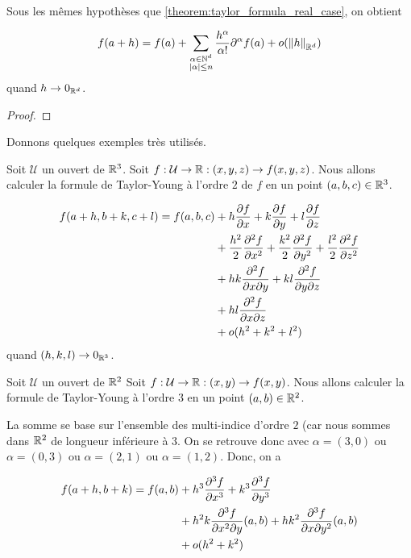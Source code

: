 \begin{theorem} 
	\label{theorem:taylor_young_formula_real_case}
	Sous les mêmes hypothèses que \ref{theorem:taylor_formula_real_case}, on
	obtient

	\begin{equation*}
		f(a + h) = f(a) + \sum_{\substack{\alpha \in \mathbb{N}^{d} \\
		|\alpha| \leq n}} \frac{h^{\alpha}}{\alpha!}
		\partial^{\alpha}f(a) + o(\norm{h}_{\mathbb{R}^{d}})
	\end{equation*}
	quand $h \rightarrow 0_{\mathbb{R}^{d}}$.
\end{theorem}

\ifdefined\outputproof
\begin{proof}

\end{proof}
\fi

Donnons quelques exemples très utilisés.

\begin{exemple}
	Soit $\mathcal{U}$ un ouvert de $\mathbb{R}^{3}$.
	Soit $f : \mathcal{U} \rightarrow \mathbb{R} : (x, y, z) \rightarrow f(x, y,
	z)$.
	Nous allons calculer la formule de Taylor-Young à l'ordre $2$ de $f$ en un
	point $(a, b, c) \in \mathbb{R}^{3}$.

	\begin{align*}
		f(a + h, b + k, c + l) = f(a, b, c)
		& + h \pdv{f}{x} (a, b, c) + k \pdv{f}{y} (a, b, c) + l \pdv{f}{z} (a, b,
		c) \\
		& + \frac{h^{2}}{2} \pdv[2]{f}{x} (a, b, c) + \frac{k^{2}}{2}
		\pdv[2]{f}{y} (a, b, c) + \frac{l^{2}}{2} \pdv[2]{f}{z} (a, b, c) \\
		& + hk \pdv{f}{x}{y} (a, b, c)
		+ kl \pdv{f}{y}{z} (a, b, c) \\
		& + hl \pdv{f}{x}{z} (a, b, c) \\
		& + o(h^{2} + k^{2} + l^{2})
	\end{align*}
	quand $(h, k, l) \rightarrow 0_{\mathbb{R}^{3}}$.
\end{exemple}

\begin{exemple}
	Soit $\mathcal{U}$ un ouvert de $\mathbb{R}^{2}$
	Soit $f : \mathcal{U} \rightarrow \mathbb{R} : (x, y) \rightarrow f(x, y)$.
	Nous allons calculer la formule de Taylor-Young à l'ordre $3$ en un point
	$(a, b) \in \mathbb{R}^{2}$.

	La somme se base sur l'ensemble des multi-indice d'ordre $2$ (car nous
	sommes dans $\mathbb{R}^{2}$ de longueur inférieure à $3$. On se retrouve donc
	avec $\alpha = (3, 0)$ ou $\alpha = (0, 3)$ ou $\alpha = (2, 1)$ ou $\alpha
	= (1, 2)$. Donc, on a

	\begin{align*}
		f(a + h, b + k) = f(a, b) & + h^{3} \pdv[3]{f}{x} (a, b) + k^{3} \pdv[3]{f}{y} (a,
		b) \\
		& + h^{2} k \frac{\partial^{3} f}{\partial x^{2} \partial y} (a, b) +
		h k^{2} \frac{\partial^{3}{f}}{\partial x \partial y^{2}} (a, b) \\
		& + o(h^{2} + k^{2})
	\end{align*}
\end{exemple}
